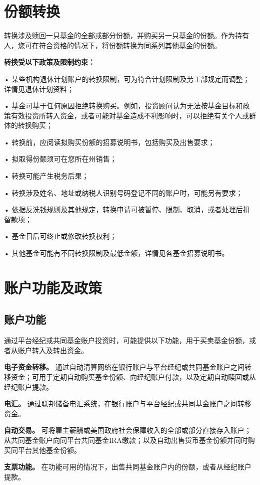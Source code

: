 \documentclass[UTF8,fontset=none,11pt,a4paper]{ctexart}
\begin{document}
\section*{份额转换}
转换涉及赎回一只基金的全部或部分份额，并购买另一只基金的份额。作为持有人，您可在符合资格的情况下，将份额转换为同系列其他基金的份额。


\textbf{转换受以下政策及限制约束：}


• 某些机构退休计划账户的转换限制，可为符合计划限制及劳工部规定而调整；详情见退休计划资料；


• 基金可基于任何原因拒绝转换购买。例如，投资顾问认为无法按基金目标和政策有效投资所转入资金，或者可能对基金造成不利影响时，可以拒绝有关个人或群体的转换购买；


• 转换前，应阅读拟购买份额的招募说明书，包括购买及出售要求；


• 拟取得份额须可在您所在州销售；


• 转换可能产生税务后果；


• 转换涉及姓名、地址或纳税人识别号码登记不同的账户时，可能另有要求；


• 依据反洗钱规则及其他规定，转换申请可被暂停、限制、取消，或者处理后扣留款项；


• 基金日后可终止或修改转换权利；


• 其他基金可能有不同转换限制及最低金额，详情见各基金招募说明书。


\section*{账户功能及政策}
\subsection*{账户功能}
通过平台经纪或共同基金账户投资时，可能提供以下功能，用于买卖基金份额，或者从账户转入及转出资金。


\textbf{电子资金转移。} 通过自动清算网络在银行账户与平台经纪或共同基金账户之间转移资金；可用于定期自动购买基金份额、向经纪账户付款，以及定期自动赎回或从经纪账户提款。


\textbf{电汇。} 通过联邦储备电汇系统，在银行账户与平台经纪或共同基金账户之间转移资金。


\textbf{自动交易。} 可将雇主薪酬或美国政府社会保障收入的全部或部分直接存入账户；从共同基金账户向同平台共同基金IRA缴款；以及自动出售货币基金份额并同时购买同平台其他基金份额。


\textbf{支票功能。} 在功能可用的情况下，出售共同基金账户内的份额，或者从经纪账户提款。
\end{document}
